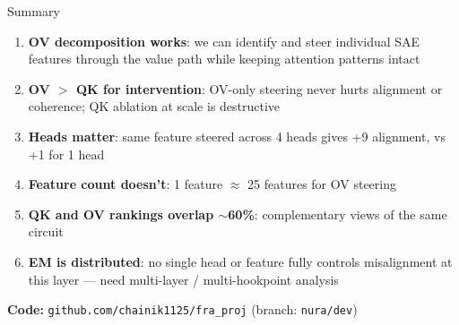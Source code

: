 \documentclass[aspectratio=169]{beamer}
\begin{document}
\begin{frame}{Summary}
\begin{enumerate}
    \item \textbf{OV decomposition works}: we can identify and steer individual SAE features through the value path while keeping attention patterns intact

    \item \textbf{OV $>$ QK for intervention}: OV-only steering never hurts alignment or coherence; QK ablation at scale is destructive

    \item \textbf{Heads matter}: same feature steered across 4 heads gives +9 alignment, vs +1 for 1 head

    \item \textbf{Feature count doesn't}: 1 feature $\approx$ 25 features for OV steering

    \item \textbf{QK and OV rankings overlap $\sim$60\%}: complementary views of the same circuit

    \item \textbf{EM is distributed}: no single head or feature fully controls misalignment at this layer --- need multi-layer / multi-hookpoint analysis
\end{enumerate}

\vspace{0.5em}
\begin{center}
\textbf{Code:} \texttt{github.com/chainik1125/fra\_proj} (branch: \texttt{nura/dev})
\end{center}
\end{frame}
\end{document}
